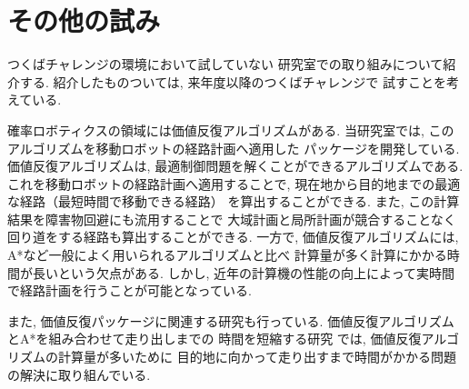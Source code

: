 \documentclass[twocolumn,9pt]{jsproceedings}
\begin{document}
\section{その他の試み}

つくばチャレンジの環境において試していない
研究室での取り組みについて紹介する. 
紹介したものついては, 来年度以降のつくばチャレンジで
試すことを考えている. 

確率ロボティクスの領域には価値反復アルゴリズム\cite{上田詳解}がある. 
当研究室では, このアルゴリズムを移動ロボットの経路計画へ適用した
パッケージを開発している\cite{ueda2023JRM}. 
価値反復アルゴリズムは, 最適制御問題を解くことができるアルゴリズムである. 
これを移動ロボットの経路計画へ適用することで, 
現在地から目的地までの最適な経路（最短時間で移動できる経路）
を算出することができる. 
また, この計算結果を障害物回避にも流用することで
大域計画と局所計画が競合することなく回り道をする経路も算出することができる. 
一方で, 価値反復アルゴリズムには, A*など一般によく用いられるアルゴリズムと比べ
計算量が多く計算にかかる時間が長いという欠点がある. 
しかし, 近年の計算機の性能の向上によって実時間で経路計画を行うことが可能となっている. 

また, 価値反復パッケージに関連する研究も行っている. 
価値反復アルゴリズムとA*を組み合わせて走り出しまでの
時間を短縮する研究\cite{中村2024}
では, 価値反復アルゴリズムの計算量が多いために
目的地に向かって走り出すまで時間がかかる問題の解決に取り組んでいる. 





\end{document}
